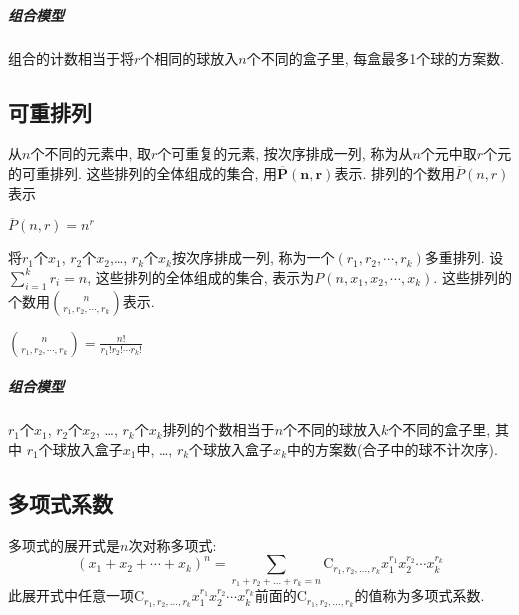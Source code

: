         \subparagraph{组合模型}

            组合的计数相当于将$r$个相同的球放入$n$个不同的盒子里, 每盒最多1个球的方案数.

    \subsection{可重排列}

        \begin{definition}[可重排列]
            从$n$个不同的元素中, 取$r$个可重复的元素, 按次序排成一列, 称为从$n$个元中取$r$个元的\textsf{可重排列}. 这些排列的全体组成的集合, 用$\mathbf{\overline{P}(n,r)}$表示.  排列的个数用$\overline{P}(n,r)$表示
        \end{definition}

        \begin{theorem}
            $\overline{P}(n,r)=n^r$
        \end{theorem}

        \begin{definition}[多重排列]
            将$r_1$个$x_1$, $r_2$个$x_2$,\ldots, $r_k$个$x_k$按次序排成一列, 称为一个$(r_1,r_2,\cdots,r_k)$\textsf{多重排列}. 设$\sum_{i=1}^kr_i=n$, 这些排列的全体组成的集合, 表示为$P(n,x_1,x_2,\cdots,x_k)$. 这些排列的个数用$n\choose{r_1,r_2,\cdots,r_k}$表示. 
        \end{definition}

        \begin{theorem}
            ${n\choose{r_1,r_2,\cdots,r_k}}=\frac{n!}{r_1!r_2!\cdots r_k!}$
        \end{theorem}

        \subparagraph{组合模型}

            $r_1$个$x_1$, $r_2$个$x_2$, \ldots, $r_k$个$x_k$排列的个数相当于$n$个不同的球放入$k$个不同的盒子里, 其中 $r_1$个球放入盒子$x_1$中, \ldots, $r_k$个球放入盒子$x_k$中的方案数(合子中的球不计次序). 

    \subsection{多项式系数}

        \begin{definition}[多项式系数]
            多项式的展开式是$n$次对称多项式:
            \[(x_1+x_2+\cdots+x_k)^n=\sum_{r_1+r_2+\ldots+r_k=n}\mathrm{C}_{r_1,r_2,\ldots,r_k}x_1^{r_1}x_2^{r_2}\cdots x_k^{r_k}\]
            此展开式中任意一项$\mathrm{C}_{r_1,r_2,\ldots,r_k}x_1^{r_1}x_2^{r_2}\cdots x_k^{r_k}$前面的$\mathrm{C}_{r_1,r_2,\ldots,r_k}$的值称为\textsf{多项式系数}.
        \end{definition}

